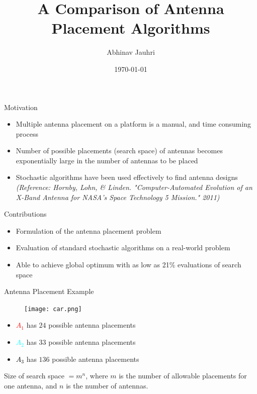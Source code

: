 \documentclass{beamer}
\title{\color{univred} A Comparison of Antenna Placement Algorithms}
\author{Abhinav Jauhri}
\date{\today}
\begin{document}
    \begin{frame}
        \color{univred}
        \titlepage
    \end{frame}

    \begin{frame}[t]{Motivation}
        \begin{itemize}
            \item<1->Multiple antenna placement on a platform is a manual, and time consuming process
            \item<2->Number of possible placements (search space) of antennas becomes exponentially large in the number of antennas to be placed
            \item<3-> Stochastic algorithms have been used effectively to find antenna designs {\textit{\small (Reference: Hornby, Lohn, \& Linden. "Computer-Automated Evolution of an X-Band Antenna for NASA's Space Technology 5 Mission." 2011)}}
        \end{itemize}
        \vspace{5mm}
        \centering{}
    \end{frame}
 
    \begin{frame}[t]{Contributions}
        \begin{itemize}
            \item Formulation of the antenna placement problem
            \item Evaluation of standard stochastic algorithms on a real-world problem
            \item Able to achieve global optimum with as low as 21\% evaluations of search space
        \end{itemize}
        \vspace{5mm}
    \end{frame}
   

    \begin{frame}[t]{Antenna Placement Example}
        \begin{figure}
            \centering
            \texttt{[image: car.png]}
        \end{figure}
        \begin{itemize}
            \item \textcolor{red}{$A_1$} has $24$ possible antenna placements
            \item \textcolor{cyan}{$A_2$} has $33$ possible antenna placements
            \item \textcolor{black}{$A_3$} has $136$ possible antenna placements
        \end{itemize}
        Size of search space $= m^n$, where $m$ is the number of allowable placements for one antenna, and $n$ is the number of antennas.
    \end{frame}
\end{document}
